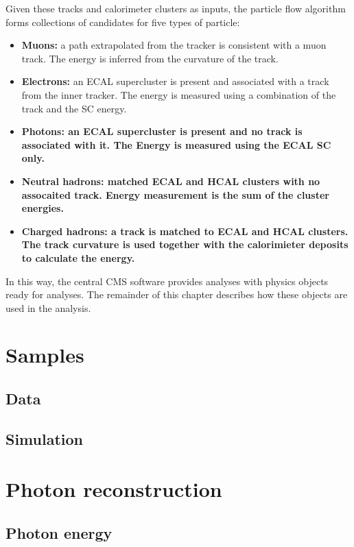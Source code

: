 Given these tracks and calorimeter clusters as inputs, the particle flow algorithm forms collections of candidates for five types of particle:
\begin{itemize}
  \item{\textbf{Muons:} a path extrapolated from the tracker is consistent with a muon track. 
                        The energy is inferred from the curvature of the track.} %
  \item{\textbf{Electrons:} an ECAL supercluster is present and associated with a track from the inner tracker. 
                            The energy is measured using a combination of the track \pt and the SC energy.}
  \item{\textbf{Photons: an ECAL supercluster is present and no track is associated with it.
                          The Energy is measured using the ECAL SC only.}}
  \item{\textbf{Neutral hadrons: matched ECAL and HCAL clusters with no assocaited track.
                                 Energy measurement is the sum of the cluster energies.}}
  \item{\textbf{Charged hadrons: a track is matched to ECAL and HCAL clusters.
                                 The track curvature is used together with the calorimieter deposits to calculate the energy.}}
\end{itemize}

In this way, the central CMS software provides analyses with physics objects ready for analyses.
The remainder of this chapter describes how these objects are used in the \Hgg analysis.

\section{Samples}
\subsection{Data}
\subsection{Simulation}

\section{Photon reconstruction}
\subsection{Photon energy}
